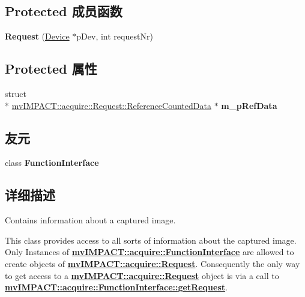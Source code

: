 \subsection*{Protected 成员函数}
\begin{DoxyCompactItemize}
\item 
\hypertarget{classmv_i_m_p_a_c_t_1_1acquire_1_1_request_a582f7755c88d450da1c9c4ff0f818d02}{{\bfseries Request} (\hyperlink{classmv_i_m_p_a_c_t_1_1acquire_1_1_device}{Device} $\ast$p\+Dev, int request\+Nr)}\label{classmv_i_m_p_a_c_t_1_1acquire_1_1_request_a582f7755c88d450da1c9c4ff0f818d02}

\end{DoxyCompactItemize}
\subsection*{Protected 属性}
\begin{DoxyCompactItemize}
\item 
\hypertarget{classmv_i_m_p_a_c_t_1_1acquire_1_1_request_ab173ef7ecf6f0d750214fd6d3afc16fc}{struct \\*
\hyperlink{structmv_i_m_p_a_c_t_1_1acquire_1_1_request_1_1_reference_counted_data}{mv\+I\+M\+P\+A\+C\+T\+::acquire\+::\+Request\+::\+Reference\+Counted\+Data} $\ast$ {\bfseries m\+\_\+p\+Ref\+Data}}\label{classmv_i_m_p_a_c_t_1_1acquire_1_1_request_ab173ef7ecf6f0d750214fd6d3afc16fc}

\end{DoxyCompactItemize}
\subsection*{友元}
\begin{DoxyCompactItemize}
\item 
\hypertarget{classmv_i_m_p_a_c_t_1_1acquire_1_1_request_a09d9d7eed388a7128da621fce0de1548}{class {\bfseries Function\+Interface}}\label{classmv_i_m_p_a_c_t_1_1acquire_1_1_request_a09d9d7eed388a7128da621fce0de1548}

\end{DoxyCompactItemize}


\subsection{详细描述}
Contains information about a captured image. 

This class provides access to all sorts of information about the captured image. Only Instances of {\bfseries \hyperlink{classmv_i_m_p_a_c_t_1_1acquire_1_1_function_interface}{mv\+I\+M\+P\+A\+C\+T\+::acquire\+::\+Function\+Interface}} are allowed to create objects of {\bfseries \hyperlink{classmv_i_m_p_a_c_t_1_1acquire_1_1_request}{mv\+I\+M\+P\+A\+C\+T\+::acquire\+::\+Request}}. Consequently the only way to get access to a {\bfseries \hyperlink{classmv_i_m_p_a_c_t_1_1acquire_1_1_request}{mv\+I\+M\+P\+A\+C\+T\+::acquire\+::\+Request}} object is via a call to {\bfseries \hyperlink{classmv_i_m_p_a_c_t_1_1acquire_1_1_function_interface_afea62dee2bda1b47c24821f9121c5505}{mv\+I\+M\+P\+A\+C\+T\+::acquire\+::\+Function\+Interface\+::get\+Request}}.

